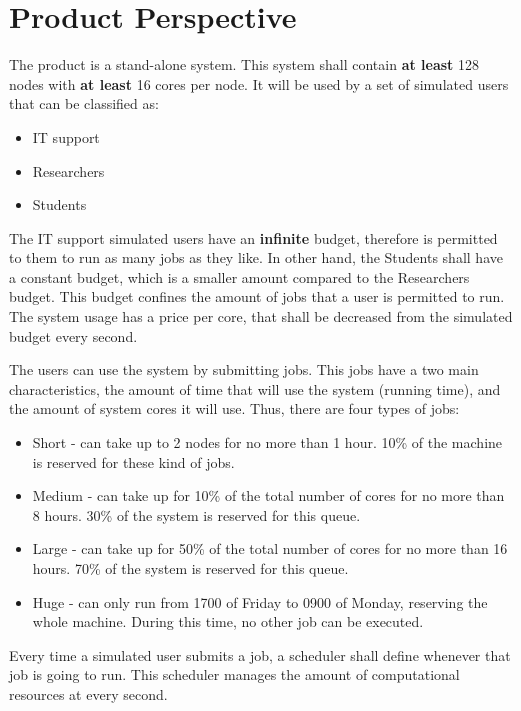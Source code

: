 \documentclass{scrreprt}
\begin{document}
\section{Product Perspective}
\par The product is a stand-alone system. This system shall contain \textbf{at least} 128 nodes with \textbf{at least} 16 cores per node. It will be used by a set of simulated users that can be classified as:

\begin{itemize}
\item IT support
\item Researchers
\item Students
\end{itemize}

\par The IT support simulated users have an \textbf{infinite} budget, therefore is permitted to them to run as many jobs as they like. In other hand, the Students shall have a constant budget, which is a smaller amount compared to the Researchers budget. This budget confines the amount of jobs that a user is permitted to run. The system usage has a price per core, that shall be decreased from the simulated budget every second.
\par The users can use the system by submitting jobs. This jobs have a two main characteristics, the amount of time that will use the system (running time), and the amount of system cores it will use. Thus, there are four types of jobs:

\begin{itemize}
\item Short - can take up to 2 nodes for no more than 1 hour. 10\% of the machine is reserved for these kind of jobs.
\item Medium - can take up for 10\% of the total number of cores for no more than 8 hours. 30\% of the system is reserved for this queue.
\item Large - can take up for 50\% of the total number of cores for no more than 16 hours. 70\% of the system is reserved for this queue.
\item Huge - can only run from 1700 of Friday to 0900 of Monday, reserving the whole machine. During this time, no other job can be executed.
\end{itemize}

\par Every time a simulated user submits a job, a scheduler shall define whenever that job is going to run. This scheduler manages the amount of computational resources at every second.
\end{document}

